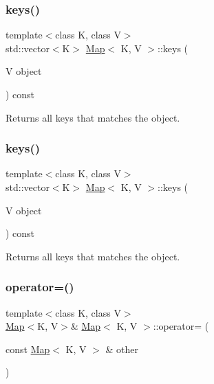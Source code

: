 \subsubsection{\texorpdfstring{keys()}{keys()}\hspace{0.1cm}{\footnotesize\ttfamily [3/4]}}
{\footnotesize\ttfamily template$<$class K, class V$>$ \\
std\+::vector$<$K$>$ \hyperlink{classMap}{Map}$<$ K, V $>$\+::keys (\begin{DoxyParamCaption}\item[{V}]{object }\end{DoxyParamCaption}) const\hspace{0.3cm}{\ttfamily [inline]}}

Returns all keys that matches the object. \mbox{\label{classMap_ac01797a15562fef9b26ddc36256776e8}} 
\subsubsection{\texorpdfstring{keys()}{keys()}\hspace{0.1cm}{\footnotesize\ttfamily [4/4]}}
{\footnotesize\ttfamily template$<$class K, class V$>$ \\
std\+::vector$<$K$>$ \hyperlink{classMap}{Map}$<$ K, V $>$\+::keys (\begin{DoxyParamCaption}\item[{V}]{object }\end{DoxyParamCaption}) const\hspace{0.3cm}{\ttfamily [inline]}}

Returns all keys that matches the object. \mbox{\label{classMap_aa4378eae3c16e838cb1654d6d99bfa0b}} 
\subsubsection{\texorpdfstring{operator=()}{operator=()}\hspace{0.1cm}{\footnotesize\ttfamily [1/4]}}
{\footnotesize\ttfamily template$<$class K, class V$>$ \\
\hyperlink{classMap}{Map}$<$K, V$>$\& \hyperlink{classMap}{Map}$<$ K, V $>$\+::operator= (\begin{DoxyParamCaption}\item[{const \hyperlink{classMap}{Map}$<$ K, V $>$ \&}]{other }\end{DoxyParamCaption})\hspace{0.3cm}{\ttfamily [inline]}}

